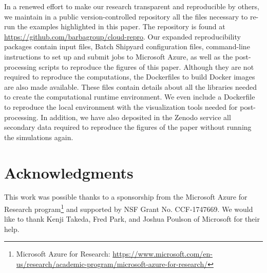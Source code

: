 \documentclass[10pt,journal,compsoc]{IEEEtran}
\begin{document}
In a renewed effort to make our research transparent and reproducible by others, we maintain in a public version-controlled repository all the files necessary to re-run the examples highlighted in this paper.
The repository is found at \url{https://github.com/barbagroup/cloud-repro}.
Our expanded reproducibility packages contain input files, Batch Shipyard configuration files, command-line instructions to set up and submit jobs to Microsoft Azure, as well as the post-processing scripts to reproduce the figures of this paper.
Although they are not required to reproduce the computations, the Dockerfiles to build Docker images are also made available. 
These files contain details about all the libraries needed to create the computational runtime environment.
We even include a Dockerfile to reproduce the local environment with the visualization tools needed for post-processing.
In addition, we have also deposited in the Zenodo service all secondary data required to reproduce the figures of the paper without running the simulations again\cite{cloud_repro_2019}.

\section*{Acknowledgments}

This work was possible thanks to a sponsorship from the Microsoft Azure for Research program\footnote{Microsoft Azure for Research: \url{https://www.microsoft.com/en-us/research/academic-program/microsoft-azure-for-research/}} and supported by NSF Grant No. CCF-1747669.
We would like to thank Kenji Takeda, Fred Park, and Joshua Poulson of Microsoft for their help.



%
\end{document}
